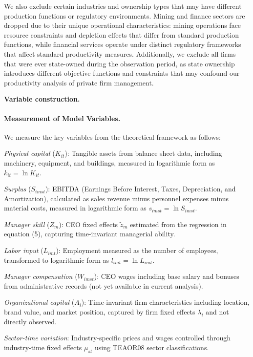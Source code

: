 \documentclass[11pt,a4paper]{article}
\begin{document}
We also exclude certain industries and ownership types that may have different production functions or regulatory environments. Mining and finance sectors are dropped due to their unique operational characteristics: mining operations face resource constraints and depletion effects that differ from standard production functions, while financial services operate under distinct regulatory frameworks that affect standard productivity measures. Additionally, we exclude all firms that were ever state-owned during the observation period, as state ownership introduces different objective functions and constraints that may confound our productivity analysis of private firm management.

\textbf{Variable construction.} 
\paragraph{Measurement of Model Variables.} We measure the key variables from the theoretical framework as follows:

\textit{Physical capital} ($K_{it}$): Tangible assets from balance sheet data, including machinery, equipment, and buildings, measured in logarithmic form as $k_{it} = \ln K_{it}$.

\textit{Surplus} ($S_{imst}$): EBITDA (Earnings Before Interest, Taxes, Depreciation, and Amortization), calculated as sales revenue minus personnel expenses minus material costs, measured in logarithmic form as $s_{imst} = \ln S_{imst}$.

\textit{Manager skill} ($Z_m$): CEO fixed effects $\tilde{z}_m$ estimated from the regression in equation (5), capturing time-invariant managerial ability.

\textit{Labor input} ($L_{imt}$): Employment measured as the number of employees, transformed to logarithmic form as $l_{imt} = \ln L_{imt}$.

\textit{Manager compensation} ($W_{imst}$): CEO wages including base salary and bonuses from administrative records (not yet available in current analysis).

\textit{Organizational capital} ($A_i$): Time-invariant firm characteristics including location, brand value, and market position, captured by firm fixed effects $\lambda_i$ and not directly observed.

\textit{Sector-time variation}: Industry-specific prices and wages controlled through industry-time fixed effects $\mu_{st}$ using TEAOR08 sector classifications.
\end{document}
